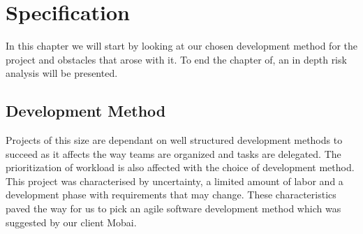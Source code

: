 \chapter{Specification}
\label{chap:Specification}
In this chapter we will start by looking at our chosen development method for the project and obstacles that arose with it. To end the chapter of, an in depth risk analysis will be presented.


\section{Development Method}
Projects of this size are dependant on well structured development methods to succeed as it affects the way teams are organized and tasks are delegated. The prioritization of workload is also affected with the choice of development method. 
This project was characterised by uncertainty, a limited amount of labor and a development phase with requirements that may change. These characteristics paved the way for us to pick an agile software development method which was suggested by our client Mobai.  
